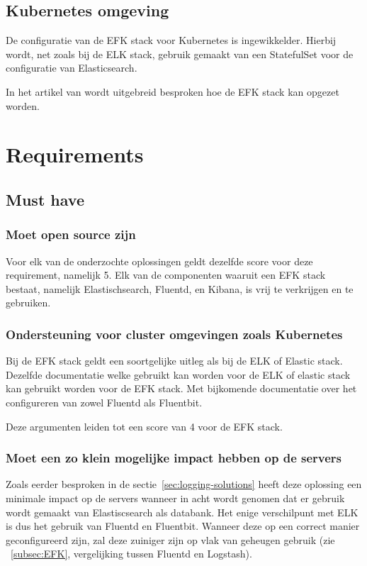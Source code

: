 \subsection{Kubernetes omgeving}
De configuratie van de EFK stack voor Kubernetes is ingewikkelder. Hierbij wordt, net zoals bij de ELK stack, gebruik gemaakt van een StatefulSet voor de configuratie van Elasticsearch.

In het artikel van \cite{jetha2018} wordt uitgebreid besproken hoe de EFK stack kan opgezet worden. 

\section{Requirements}

\subsection{Must have}
\subsubsection{Moet open source zijn}
Voor elk van de onderzochte oplossingen geldt dezelfde score voor deze requirement, namelijk 5. Elk van de componenten waaruit een EFK stack bestaat, namelijk Elastischsearch, Fluentd, en Kibana, is vrij te verkrijgen en te gebruiken.

\subsubsection{Ondersteuning voor cluster omgevingen zoals Kubernetes}
Bij de EFK stack geldt een soortgelijke uitleg als bij de ELK of Elastic stack. Dezelfde documentatie welke gebruikt kan worden voor de ELK of elastic stack kan gebruikt worden voor de EFK stack. Met bijkomende documentatie over het configureren van zowel Fluentd als Fluentbit. 

Deze argumenten leiden tot een score van 4 voor de EFK stack.

\subsubsection{Moet een zo klein mogelijke impact hebben op de servers}
Zoals eerder besproken in de sectie~\ref{sec:logging-solutions} heeft deze oplossing een minimale impact op de servers wanneer in acht wordt genomen dat er gebruik wordt gemaakt van Elastiscsearch als databank. Het enige verschilpunt met ELK is dus het gebruik van Fluentd en Fluentbit. Wanneer deze op een correct manier geconfigureerd zijn, zal deze zuiniger zijn op vlak van geheugen gebruik (zie ~\ref{subsec:EFK}, vergelijking tussen Fluentd en Logstash). 

